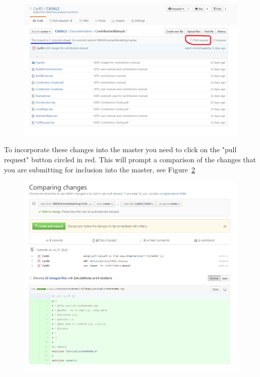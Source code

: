 \begin{figure}[!ht]
	\includegraphics[scale=0.6]{Figures/Pull_request0.png}
	\caption{}\label{fig:fork_merge}
\end{figure}

To incorporate these changes into the master you need to click on the "pull request" button circled in red. This will prompt a comparison of the changes that you are submitting for inclusion into the master, see Figure~\ref{fig:fork_merge1}
\clearpage
\begin{figure}[!ht]
	\includegraphics[scale=0.6]{Figures/Pull_request.png}
	\caption{}\label{fig:fork_merge1}
\end{figure}

